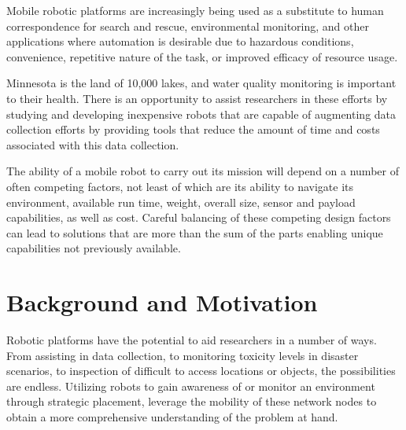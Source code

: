 
Mobile robotic platforms are increasingly being used as a substitute to human correspondence for search and rescue, environmental monitoring, and other applications where automation is desirable due to hazardous conditions, convenience, repetitive nature of the task, or improved efficacy of resource usage. 

Minnesota is the land of 10,000 lakes, and water quality monitoring is important to their health. There is an opportunity to assist researchers in these efforts by studying and developing inexpensive robots that are capable of augmenting data collection efforts by providing tools that reduce the amount of time and costs associated with this data collection. 

The ability of a mobile robot to carry out its mission will depend on a number of often competing factors, not least of which are its ability to navigate its environment, available run time, weight, overall size, sensor and payload capabilities, as well as cost. Careful balancing of these competing design factors can lead to solutions that are more than the sum of the parts enabling unique capabilities not previously available.

\section{Background and Motivation}
	\label{sec:background_and_motivation}


	Robotic platforms have the potential to aid researchers in a number of ways.  From assisting in data collection, to monitoring toxicity levels in disaster scenarios, to inspection of difficult to access locations or objects, the possibilities are endless. Utilizing robots to gain awareness of or monitor an environment through strategic placement, leverage the mobility of these network nodes to obtain a more comprehensive understanding of the problem at hand. 

